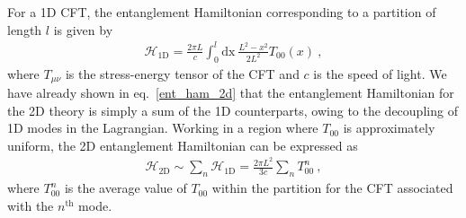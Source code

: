 For a 1D CFT, the entanglement Hamiltonian corresponding to a partition of length \(l\) is given by~\cite{bisognanoWichmann_scalar,bisognanoWichmann_quantum}
\begin{equation}\begin{aligned}
	\mathcal{H}_\text{1D} = \frac{2\pi L}{c}\int_0^l\mathrm{dx}~ \frac{L^2 - x^2}{2L^2}T_{00}(x)~,
\end{aligned}\end{equation}
where \(T_{\mu\nu}\) is the stress-energy tensor of the CFT and \(c\) is the speed of light. We have already shown in eq.~\eqref{ent_ham_2d} that the entanglement Hamiltonian for the 2D theory is simply a sum of the 1D counterparts, owing to the decoupling of 1D modes in the Lagrangian. Working in a region where \(T_{00}\) is approximately uniform, the 2D entanglement Hamiltonian can be expressed as
\begin{equation}\begin{aligned}
	\mathcal{H}_\text{2D} \sim \sum_n \mathcal{H}_\text{1D} = \frac{2\pi L^2}{3c}\sum_n T^n_{00}~,
\end{aligned}\end{equation}
where \(T^n_\text{00}\) is the average value of \(T_{00}\) within the partition for the CFT associated with the \(n^\text{th}\) mode.

